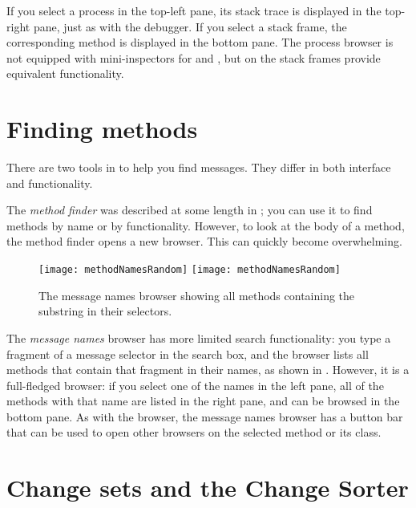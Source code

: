 \documentclass[a4paper,10pt,twoside]{book}
\begin{document}
If you select a process in the top-left pane, its stack trace is displayed in the top-right pane, just as with the debugger.
If you select a stack frame, the corresponding method is displayed in the bottom pane.
The process browser is not equipped with mini-inspectors for \self and , but  on the stack frames provide equivalent functionality.

\section{Finding methods}

There are two tools in \pharo to help you find messages.
They differ in both interface and functionality.

The \emph{method finder} was described at some length in ; you can use it to find methods by name or by functionality. 
However, to look at the body of a method, the method finder opens a new browser.
This can quickly become overwhelming.

\begin{figure}[btp]
	\begin{center}
	\ifluluelse
		{\texttt{[image: methodNamesRandom]}}
		{\texttt{[image: methodNamesRandom]}}
	\end{center}
	\caption{The message names browser showing all methods containing the substring  in their selectors.}
\end{figure}

The \emph{message names} browser has more limited search functionality: you type a fragment of a message selector in the search box, and the browser lists all methods that contain that fragment in their names, as shown in .
However, it is a full-fledged browser:
if you select one of the names in the left pane, all of the methods with that name are listed in the right pane, and can be browsed in the bottom pane.
As with the browser, the message names browser has a button bar that can be used to open other  browsers on the selected method or its class.



\section{Change sets and the Change Sorter}
\end{document}
